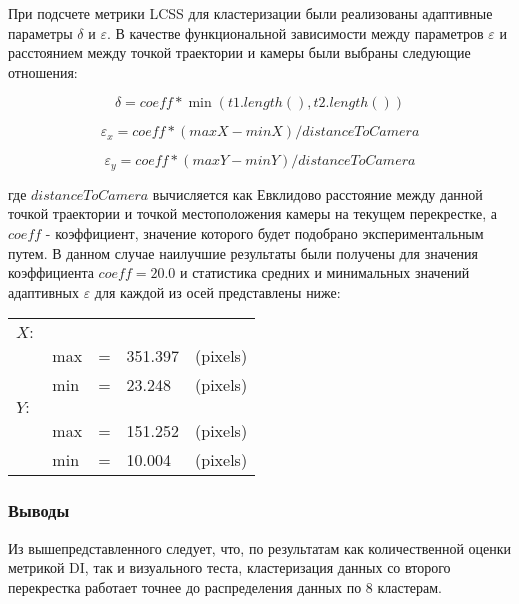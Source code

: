 При подсчете метрики LCSS для кластеризации были реализованы адаптивные параметры $\delta$ и $\varepsilon$. В качестве функциональной зависимости между параметров $\varepsilon$ и расстоянием между точкой траектории и камеры были выбраны следующие отношения:

\begin{equation} \label{eq:delta-adapt}
	\delta = coeff * \min{(t1.length(), t2.length())}
\end{equation}

\begin{equation} \label{eq:epsilonX-adapt}
\varepsilon_x = coeff * (maxX - minX) / distanceToCamera
\end{equation}

\begin{equation} \label{eq:epsilonY-adapt}
\varepsilon_y = coeff * (maxY - minY) / distanceToCamera
\end{equation}

где $distanceToCamera$ вычисляется как Евклидово расстояние между данной точкой траектории и точкой местоположения камеры на текущем перекрестке, а $coeff$ - коэффициент, значение которого будет подобрано экспериментальным путем. В данном случае наилучшие результаты были получены для значения коэффициента $coeff = 20.0$ и статистика средних и минимальных значений адаптивных $\varepsilon$ для каждой из осей представлены ниже:

\begin{tabular}{lllll}
	\multicolumn{5}{c}{\bm{$\varepsilon$}}\\
	$X:$       			& & & \\[0.5ex]
						& max 	& = 	& 351.397 	& (pixels) \\[0.5ex]
						& min 	& = 	& 23.248 	& (pixels) \\[0.5ex]
	$Y:$       			& & & \\[0.5ex]
						& max 	& = 	& 151.252 	& (pixels) \\[0.5ex]
						& min 	& = 	& 10.004 	& (pixels) \\[0.5ex]

\end{tabular}

\subsubsection{Выводы}

Из вышепредставленного следует, что, по результатам как количественной оценки метрикой DI, так и визуального теста, кластеризация данных со второго перекрестка работает точнее до распределения данных по 8 кластерам.